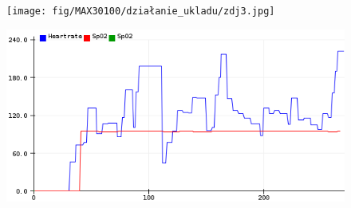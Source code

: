 \documentclass[11pt, a4paper]{article}
\begin{document}
\begin{figure}[h]
\centering
\texttt{[image: fig/MAX30100/działanie\_ukladu/zdj3.jpg]}
\label{fig:_zasada_dzialania_elementu}
\end{figure}
\begin{figure}[h]
\centering
\includegraphics[width=\linewidth]{fig/MAX30100/działanie_ukladu/tętno_i_Spo.png}
\label{fig:_zdjecie_elementu}
\end{figure}




\newpage
\printbibliography[heading=bibintoc]
\end{document}
